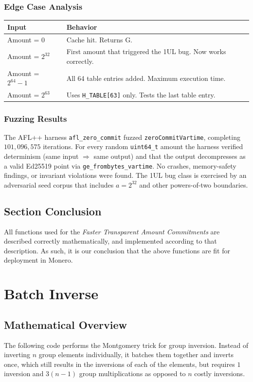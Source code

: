 \documentclass[12pt,titlepage,table]{article}
\begin{document}
\subsubsection{Edge Case Analysis}
\begin{table}[htbp]
\centering
{
\begin{tabular}{| l | l |}
\hline
\textbf{Input} & \textbf{Behavior} \\
\hline
\hline
Amount = $0$ & Cache hit. Returns G. \\
Amount = $2^{32}$ & First amount that triggered the 1UL bug. Now works correctly.\\
Amount = $2^{64} - 1$ & All 64 table entries added. Maximum execution time. \\
Amount = $2^{63}$ & Uses \verb+H_TABLE[63]+ only. Tests the last table entry. \\
\hline
\end{tabular}}
\end{table}

\subsubsection{Fuzzing Results}
The AFL++ harness \verb+afl_zero_commit+ fuzzed \verb+zeroCommitVartime+, completing $101{,}096{,}575$ iterations. For every random \verb+uint64_t+ amount the harness verified determinism (same input $\Rightarrow$ same output) and that the output decompresses as a valid Ed25519 point via \verb+ge_frombytes_vartime+.  No crashes, memory-safety findings, or invariant violations were found.  The 1UL bug class is exercised by an adversarial seed corpus that includes $a = 2^{32}$ and other powers-of-two boundaries.

\subsection[Section Conclusion]{Section Conclusion \hfill \checkmark}
All functions used for the \textit{Faster Transparent Amount Commitments} are described correctly mathematically, and implemented according to that description. As such, it is our conclusion that the above functions are fit for deployment in Monero.

\newpage
\section{Batch Inverse}
\subsection{Mathematical Overview}
\indent \indent The following code performs the Montgomery trick for group inversion. Instead of inverting $n$ group elements individually, it batches them together and inverts once, which still results in the inversions of each of the elements, but requires $1$ inversion and $3(n-1)$ group multiplications as opposed to $n$ costly inversions.
\end{document}
